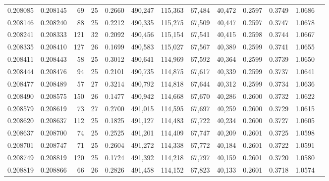 \begin{tabular}{rrrrrrrrrrrrr}
0.208085 & 0.208145 &  69 &  25 &                                     0.2660 & 490,247 & 115,363 &  67,484 &  40,472 & 0.2597 & 0.3749 & 1.0686 \\
0.208146 & 0.208240 &  88 &  25 &                                     0.2212 & 490,335 & 115,275 &  67,509 &  40,447 & 0.2597 & 0.3747 & 1.0678 \\
0.208241 & 0.208333 & 121 &  32 &                                     0.2092 & 490,456 & 115,154 &  67,541 &  40,415 & 0.2598 & 0.3744 & 1.0667 \\
0.208335 & 0.208410 & 127 &  26 &                                     0.1699 & 490,583 & 115,027 &  67,567 &  40,389 & 0.2599 & 0.3741 & 1.0655 \\
0.208411 & 0.208443 &  58 &  25 &                                     0.3012 & 490,641 & 114,969 &  67,592 &  40,364 & 0.2599 & 0.3739 & 1.0650 \\
0.208444 & 0.208476 &  94 &  25 &                                     0.2101 & 490,735 & 114,875 &  67,617 &  40,339 & 0.2599 & 0.3737 & 1.0641 \\
0.208477 & 0.208489 &  57 &  27 &                                     0.3214 & 490,792 & 114,818 &  67,644 &  40,312 & 0.2599 & 0.3734 & 1.0636 \\
0.208490 & 0.208575 & 150 &  26 &                                     0.1477 & 490,942 & 114,668 &  67,670 &  40,286 & 0.2600 & 0.3732 & 1.0622 \\
0.208579 & 0.208619 &  73 &  27 &                                     0.2700 & 491,015 & 114,595 &  67,697 &  40,259 & 0.2600 & 0.3729 & 1.0615 \\
0.208620 & 0.208637 & 112 &  25 &                                     0.1825 & 491,127 & 114,483 &  67,722 &  40,234 & 0.2600 & 0.3727 & 1.0605 \\
0.208637 & 0.208700 &  74 &  25 &                                     0.2525 & 491,201 & 114,409 &  67,747 &  40,209 & 0.2601 & 0.3725 & 1.0598 \\
0.208701 & 0.208747 &  71 &  25 &                                     0.2604 & 491,272 & 114,338 &  67,772 &  40,184 & 0.2601 & 0.3722 & 1.0591 \\
0.208749 & 0.208819 & 120 &  25 &                                     0.1724 & 491,392 & 114,218 &  67,797 &  40,159 & 0.2601 & 0.3720 & 1.0580 \\
0.208819 & 0.208866 &  66 &  26 &                                     0.2826 & 491,458 & 114,152 &  67,823 &  40,133 & 0.2601 & 0.3718 & 1.0574 \\

\end{tabular}
